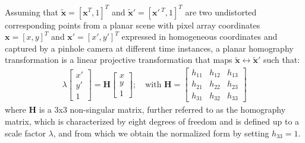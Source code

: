 Assuming that $\tilde{\boldsymbol{x}}=\left[\boldsymbol{x}^T, 1\right]^T$ and $\tilde{\boldsymbol{x}}'=\left[\boldsymbol{x}'\,^T, 1\right]^T$ are two undistorted corresponding points from a planar scene with pixel array coordinates $\boldsymbol{x}= [x,y]^T$ and $\boldsymbol{x}'= [x',y']^T$ expressed in homogeneous coordinates and captured by a pinhole camera at different time instances, a planar homography transformation is a linear projective transformation that maps $\tilde{\boldsymbol{x}}\leftrightarrow\tilde{\boldsymbol{x}}'$ such that:
\begin{align}\label{eq:sr_homo}
    \lambda 
    \begin{bmatrix}
    x'\\
    y'\\
    1
    \end{bmatrix}
    =
    \boldsymbol{H}
    \begin{bmatrix}
    x\\
    y\\
    1
    \end{bmatrix};\quad \text{with } \boldsymbol{H}=
    \begin{bmatrix}
    h_{11} & h_{12} & h_{13}\\
    h_{21} & h_{22} & h_{23}\\
    h_{31} & h_{32} & h_{33}
    \end{bmatrix}
\end{align}
where $\boldsymbol{H}$ is a 3x3 non-singular matrix, further referred to as the homography matrix, which is characterized by eight degrees of freedom and is defined up to a scale factor $\lambda$, and from which we obtain the normalized form by setting $h_{33}=1$. 

